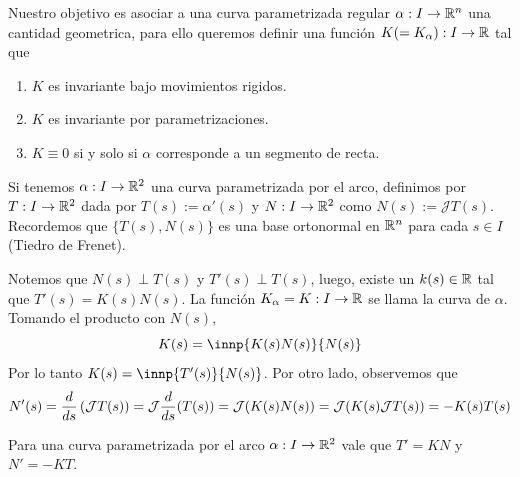 \documentclass{article}
\begin{document}
\noindent Nuestro objetivo es asociar a una curva parametrizada regular $\alpha: I\to\mathbb{R}^{n}$ una cantidad 
geometrica, para ello queremos definir una función $K(=K_{\alpha}): I\to\mathbb{R}$ tal que
\begin{enumerate}
    \item $K$ es invariante bajo movimientos rigidos.
    \item $K$ es invariante por parametrizaciones.
    \item $K\equiv0$ si y solo si $\alpha$ corresponde a un segmento de recta.
\end{enumerate}

\noindent Si tenemos $\alpha: I\to\mathbb{R}^{2}$ una curva parametrizada por el arco, definimos por $T: I\to\mathbb{R}^{2}$ 
dada por $T(s):=\alpha'(s)$ y $N: I\to\mathbb{R}^{2}$ como $N(s):=\mathcal{J}T(s)$. Recordemos que 
$\{T(s),N(s)\}$ es una base ortonormal en $\mathbb{R}^{n}$ para cada $s\in I$ (Tiedro de Frenet).
\vspace{4mm}

\noindent Notemos que $N(s)\perp T(s)$ y $T'(s)\perp T(s)$, luego, existe un $k(s)\in\mathbb{R}$ tal que 
$T'(s)=K(s)N(s)$. La función $K_{\alpha}=K: I\to\mathbb{R}$ se llama la curva de $\alpha$. Tomando el 
producto con $N(s)$,
\begin{equation*}
    K(s)=\innp{K(s)N(s)}{N(s)}
\end{equation*}
Por lo tanto $K(s)=\innp{T'(s)}{N(s)}$. Por otro lado, observemos que
\begin{equation*}
    N'(s)=\frac{d}{ds}\left(\mathcal{J} T(s)\right)=\mathcal{J}\frac{d}{ds}(T(s))=\mathcal{J}(K(s)N(s))=\mathcal{J}(K(s)\mathcal{J} T(s))=-K(s)T(s)
\end{equation*}

\begin{prop}
    Para una curva parametrizada por el arco $\alpha: I\to\mathbb{R}^{2}$ vale que $T'=KN$ y $N'=-KT$.
\end{prop}
\end{document}
